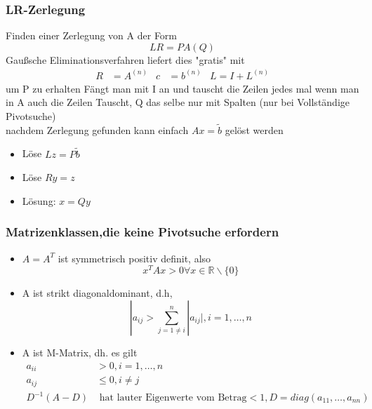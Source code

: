 \documentclass[
	ngerman,
	accentcolor=9c,%
	type=intern,
	marginpar=false
	]{tudapub}
\begin{document}
        \subsubsection{LR-Zerlegung}
            Finden einer Zerlegung von A der Form
            \begin{equation*}
                LR = PA(Q) \tag*{P = Permutationsmatrix}
            \end{equation*}
            Gaußsche Eliminationsverfahren liefert dies "gratis" mit
            \begin{align*}
                R &= A^{(n)} & c &= b^{(n)} & L = I + L^{(n)}
            \end{align*}
            um P zu erhalten Fängt man mit I an und tauscht die Zeilen jedes mal wenn man in A auch die Zeilen Tauscht, Q das selbe nur mit Spalten (nur bei Vollständige Pivotsuche) \\
            nachdem Zerlegung gefunden kann einfach $Ax = \tilde{b}$ gelöst werden
            \begin{itemize}
                \item Löse $Lz = P\tilde{b}$
                \item Löse $Ry = z$
                \item Lösung: $x=Qy$
            \end{itemize}
        \subsubsection{Matrizenklassen,die keine Pivotsuche erfordern}
            \begin{itemize}
                \item $A=A^T$ ist symmetrisch positiv definit, also
                \begin{equation*}
                    x^TAx>0 \forall x \in \mathbb{R} \backslash \{0\}
                \end{equation*}
                \item A ist strikt diagonaldominant, d.h,
                \begin{equation*}
                    |a_{ij} > \sum_{j=1\not=i}^n|a_{ij}|, i= 1,\dots,n
                \end{equation*}
                
                \item  A ist M-Matrix, dh. es gilt
                \begin{align*}
                    a_{ii} &> 0, i = 1,\dots,n\\
                    a_{ij} &\leq 0, i \not= j\\
                    D^{-1}(A-D) & \text{ hat lauter Eigenwerte vom Betrag} < 1, D=diag(a_{11},\dots,a_{nn})
                \end{align*}
            \end{itemize}
\end{document}
